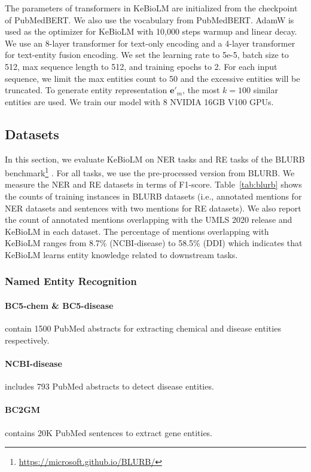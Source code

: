 \documentclass[11pt]{article}
\begin{document}
The parameters of transformers in KeBioLM are initialized from the checkpoint of PubMedBERT.
We also use the vocabulary from PubMedBERT.
AdamW \cite{loshchilov2017decoupled} is used as the optimizer for KeBioLM with 10,000 steps warmup and linear decay.
We use an 8-layer transformer for text-only encoding and a 4-layer transformer for text-entity fusion encoding.
We set the learning rate to 5e-5, batch size to 512, max sequence length to 512, and training epochs to 2.
For each input sequence, we limit the max entities count to 50 and the excessive entities will be truncated.
To generate entity representation $\mathbf{e}'_m$, the most $k=100$ similar entities are used.
We train our model with 8 NVIDIA 16GB V100 GPUs.


\subsection{Datasets}
In this section, we evaluate KeBioLM on NER tasks and RE tasks of the BLURB benchmark\footnote{\url{https://microsoft.github.io/BLURB/}} \cite{gu2020domain}.
For all tasks, we use the pre-processed version from BLURB.
We measure the NER and RE datasets in terms of F1-score.
Table~\ref{tab:blurb} shows the counts of training instances in BLURB datasets (i.e., annotated mentions for NER datasets and sentences with two mentions for RE datasets).
We also report the count of annotated mentions overlapping with the UMLS 2020 release and KeBioLM in each dataset.
The percentage of mentions overlapping with KeBioLM ranges from 8.7\% (NCBI-disease) to 58.5\% (DDI) which indicates that KeBioLM learns entity knowledge related to downstream tasks.

\subsubsection{Named Entity Recognition}
\paragraph{BC5-chem \& BC5-disease} \cite{li2016biocreative} contain 1500 PubMed abstracts for extracting chemical and disease entities respectively.

\paragraph{NCBI-disease} \cite{dougan2014ncbi} includes 793 PubMed abstracts to detect disease entities.

\paragraph{BC2GM} \cite{smith2008overview} contains 20K PubMed sentences to extract gene entities.
\end{document}
